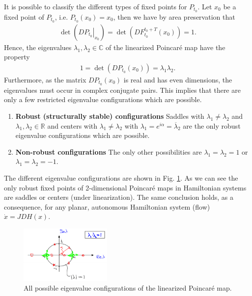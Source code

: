 It is possible to classify the different types of fixed points for $P_{t_0}$. Let $x_0$ be a fixed point of $P_{t_0}$, i.e. $P_{t_0}(x_0) = x_0$, then we have by area preservation that
\begin{align}
	\det\left( \left.DP_{t_0}\right|_{x_0}\right) = \det\left( DF_{t_0}^{t_0 + T}(x_0) \right) = 1.
\end{align}
Hence, the eigenvalues $\lambda_1, \lambda_2\in \mathbb{C}$ of the linearized Poincaré map have the property 
\begin{align}
	1 = \det\left(DP_{t_0}(x_0)\right) = \lambda_1 \lambda_2.
\end{align}
Furthermore, as the matrix $D P_{t_0}(x_0)$ is real and has even dimensions, the eigenvalues must occur in complex conjugate pairs.
This implies that there are only a few restricted eigenvalue configurations which are possible.
\begin{enumerate}
	\item \textbf{Robust (structurally stable) configurations} Saddles with $\lambda_1 \neq \lambda_2$ and $\lambda_1, \lambda_2 \in \mathbb{R}$ and centers with $\lambda_1 \neq \lambda_2$ with $\lambda_1 = e^{i \alpha } = \overline{\lambda }_2$ are the only robust eigenvalue configurations which are possible.
	\item \textbf{Non-robust configurations} The only other possibilities are $\lambda _1=\lambda _2 = 1$ or $\lambda _1 = \lambda _2 = -1$. 
\end{enumerate}
The different eigenvalue configurations are shown in Fig. \ref{fig:poinc_eigv_config}. As we can see the only robust fixed points of 2-dimensional Poincaré maps in Hamiltonian systems are saddles or centers (under linearization). The same conclusion holds, as a consequence, for any planar, autonomous Hamiltonian system (flow) $\dot{x} = JDH(x)$.
\begin{figure}[h!]
	\centering
	\includegraphics[width=0.4\textwidth]{figures/ch8/7poinc_eigv_config.png}
	\caption{All possible eigenvalue configurations of the linearized Poincaré map.}
	\label{fig:poinc_eigv_config}
\end{figure}

